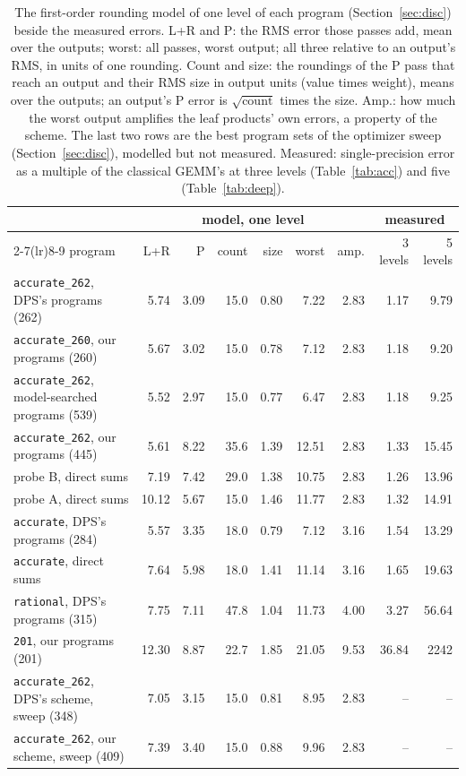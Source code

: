 \begin{table}[tb]
\centering
\caption{The first-order rounding model of one level of each program (Section~\ref{sec:disc}) beside the measured errors.  L+R and P: the RMS error those passes add, mean over the outputs; worst: all passes, worst output; all three relative to an output's RMS, in units of one rounding.  Count and size: the roundings of the P pass that reach an output and their RMS size in output units (value times weight), means over the outputs; an output's P error is $\sqrt{\mathrm{count}}$ times the size.  Amp.: how much the worst output amplifies the leaf products' own errors, a property of the scheme.  The last two rows are the best program sets of the optimizer sweep (Section~\ref{sec:disc}), modelled but not measured.  Measured: single-precision error as a multiple of the classical GEMM's at three levels (Table~\ref{tab:acc}) and five (Table~\ref{tab:deep}).}
\label{tab:model}
\footnotesize
\setlength{\tabcolsep}{4pt}
\begin{tabular}{lrrrrrrrr}
\toprule
 & \multicolumn{6}{c}{model, one level} & \multicolumn{2}{c}{measured}\\
\cmidrule(lr){2-7}\cmidrule(lr){8-9}
program & L+R & P & count & size & worst & amp. & 3 levels & 5 levels\\
\midrule
\texttt{accurate\_262}, DPS's programs (262) & 5.74 & 3.09 & 15.0 & 0.80 & 7.22 & 2.83 & 1.17 & 9.79\\
\texttt{accurate\_260}, our programs (260) & 5.67 & 3.02 & 15.0 & 0.78 & 7.12 & 2.83 & 1.18 & 9.20\\
\texttt{accurate\_262}, model-searched programs (539) & 5.52 & 2.97 & 15.0 & 0.77 & 6.47 & 2.83 & 1.18 & 9.25\\
\texttt{accurate\_262}, our programs (445) & 5.61 & 8.22 & 35.6 & 1.39 & 12.51 & 2.83 & 1.33 & 15.45\\
probe B, direct sums & 7.19 & 7.42 & 29.0 & 1.38 & 10.75 & 2.83 & 1.26 & 13.96\\
probe A, direct sums & 10.12 & 5.67 & 15.0 & 1.46 & 11.77 & 2.83 & 1.32 & 14.91\\
\texttt{accurate}, DPS's programs (284) & 5.57 & 3.35 & 18.0 & 0.79 & 7.12 & 3.16 & 1.54 & 13.29\\
\texttt{accurate}, direct sums & 7.64 & 5.98 & 18.0 & 1.41 & 11.14 & 3.16 & 1.65 & 19.63\\
\texttt{rational}, DPS's programs (315) & 7.75 & 7.11 & 47.8 & 1.04 & 11.73 & 4.00 & 3.27 & 56.64\\
\texttt{201}, our programs (201) & 12.30 & 8.87 & 22.7 & 1.85 & 21.05 & 9.53 & 36.84 & 2242\\
\midrule
\texttt{accurate\_262}, DPS's scheme, sweep (348) & 7.05 & 3.15 & 15.0 & 0.81 & 8.95 & 2.83 & -- & --\\
\texttt{accurate\_262}, our scheme, sweep (409) & 7.39 & 3.40 & 15.0 & 0.88 & 9.96 & 2.83 & -- & --\\
\bottomrule
\end{tabular}
\end{table}

